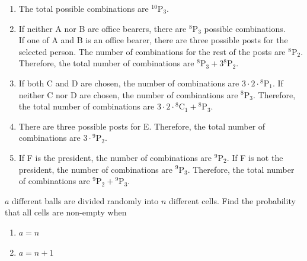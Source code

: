 \documentclass[titlepage, fleqn, a4paper, 12pt, twoside]{article}
\theoremstyle{definition}
\theoremstyle{theorem}
\newcommand*{\perm}[2]{{}^{#1}\mathrm{P}_{#2}}%
\newcommand*{\comb}[2]{{}^{#1}\mathrm{C}_{#2}}%
\begin{document}
\begin{solution}
	\begin{enumerate}[leftmargin=*]
		\item
			The total possible combinations are $\perm{10}{3}$.
		\item
			If neither A nor B are office bearers, there are $\perm{8}{3}$ possible combinations.\\
			If one of A and B is an office bearer, there are three possible posts for the selected person.
			The number of combinations for the rest of the posts are $\perm{8}{2}$.
			Therefore, the total number of combinations are $\perm{8}{3} + 3 \perm{8}{2}$.
		\item
			If both C and D are chosen, the number of combinations are $3 \cdot 2 \cdot \perm{8}{1}$.
			If neither C nor D are chosen, the number of combinations are $\perm{8}{3}$.
			Therefore, the total number of combinations are $3 \cdot 2 \cdot \comb{8}{1} + \perm{8}{3}$.
		\item
			There are three possible posts for E.
			Therefore, the total number of combinations are $3 \cdot \perm{9}{2}$.
		\item
			If F is the president, the number of combinations are $\perm{9}{2}$.
			If F is not the president, the number of combinations are $\perm{9}{3}$.
			Therefore, the total number of combinations are $\perm{9}{2} + \perm{9}{3}$.
	\end{enumerate}
\end{solution}

\begin{question}
	$a$ different balls are divided randomly into $n$ different cells.
	Find the probability that all cells are non-empty when
	\begin{enumerate}
		\item $a = n$
		\item $a = n + 1$
	\end{enumerate}
\end{question}
\end{document}
